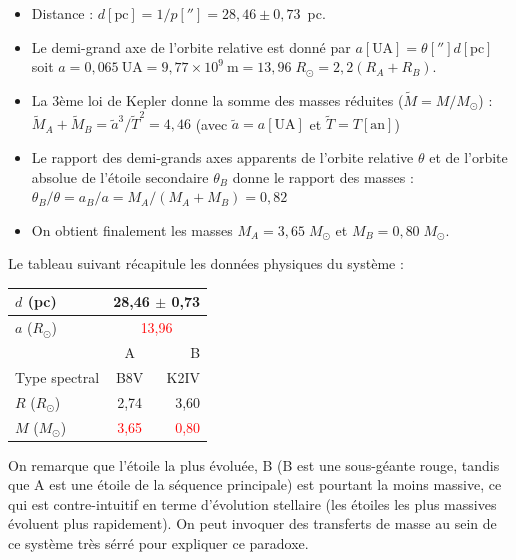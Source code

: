 \documentclass[a4paper,10pt]{report}
\newcommand{\UA}{\ensuremath{\textrm{UA}}}
\renewcommand{\u}[1]{\ensuremath{\mathrm{#1}}} %
\newcommand{\red}[1]{\textcolor{red}{#1}}
\begin{document}
\begin{Answer}
  \begin{itemize}
  \item Distance : $d [\u{pc}] = 1/p[''] = 28,46 \pm 0,73$~pc.
  \item Le demi-grand axe de l'orbite relative est donné par $a [\UA] =
    \theta [''] d [\u{pc}]$ soit $a = 0,065~\UA = 9,77 \times 10^9~\u{m} =
    13,96\;R_{\odot} = 2,2 (R_{A}+R_{B})$.
  \item La 3ème loi de Kepler donne la somme des masses réduites
    ($\tilde{M} = M/M_{\odot}$) : $\tilde{M}_A + \tilde{M}_B =
    \tilde{a}^3/\tilde{T}^2 = 4,46$ (avec $\tilde{a} = a[\UA]$ et
    $\tilde{T} = T[\u{an}]$)
  \item Le rapport des demi-grands axes apparents de l'orbite relative
    $\theta$ et de l'orbite absolue de l'étoile secondaire $\theta_B$
    donne le rapport des masses : $\theta_B / \theta = a_B / a = M_A /
    (M_A + M_B) = 0,82$
  \item On obtient finalement les masses $M_A = 3,65\;M_{\odot}$ et $M_B =
    0,80\;M_{\odot}$.
  \end{itemize}

  Le tableau suivant récapitule les données physiques du système :
  \begin{center}
    \begin{tabular}{|l|c|r|}
      \hline
      $d$ (pc) & \multicolumn{2}{c|}{28,46 $\pm$ 0,73} \\
      \hline
      $a$ ($R_{\odot}$) &  \multicolumn{2}{c|}{\red{13,96}} \\
      \hline
      & A & B \\
      \cline{1-3}
      Type spectral & B8V & K2IV \\
      \hline
      $R$ ($R_{\odot}$) & 2,74 & 3,60 \\
      \hline
      $M$ ($M_{\odot}$) & \red{3,65} & \red{0,80} \\
      \hline
    \end{tabular}
  \end{center}
  On remarque que l'étoile la plus évoluée, B (B est une sous-géante
  rouge, tandis que A est une étoile de la séquence principale) est
  pourtant la moins massive, ce qui est contre-intuitif en terme
  d'évolution stellaire (les étoiles les plus massives évoluent plus
  rapidement). On peut invoquer des transferts de masse au sein de ce
  système très sérré pour expliquer ce paradoxe.
\end{Answer}
\end{document}
